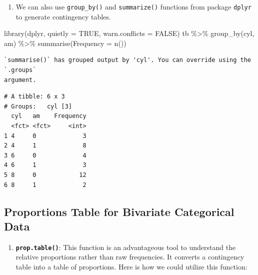 \documentclass[
  letterpaper,
  DIV=11,
  numbers=noendperiod]{scrreport}
\newenvironment{Shaded}{\begin{snugshade}}{\end{snugshade}}
\newcommand{\AttributeTok}[1]{\textcolor[rgb]{0.40,0.45,0.13}{#1}}
\newcommand{\ConstantTok}[1]{\textcolor[rgb]{0.56,0.35,0.01}{#1}}
\newcommand{\DecValTok}[1]{\textcolor[rgb]{0.68,0.00,0.00}{#1}}
\newcommand{\FunctionTok}[1]{\textcolor[rgb]{0.28,0.35,0.67}{#1}}
\newcommand{\NormalTok}[1]{\textcolor[rgb]{0.00,0.23,0.31}{#1}}
\newcommand{\OtherTok}[1]{\textcolor[rgb]{0.00,0.23,0.31}{#1}}
\newcommand{\SpecialCharTok}[1]{\textcolor[rgb]{0.37,0.37,0.37}{#1}}
\providecommand{\tightlist}{%
  \setlength{\itemsep}{0pt}\setlength{\parskip}{0pt}}\usepackage{longtable,booktabs,array}
\begin{document}
\begin{enumerate}
\def\labelenumi{\arabic{enumi}.}
\setcounter{enumi}{4}
\tightlist
\item
  We can also use \texttt{group\_by()} and \texttt{summarize()}
  functions from package \texttt{dplyr} to generate contingency tables.
\end{enumerate}

\begin{Shaded}
\begin{Highlighting}[]
\FunctionTok{library}\NormalTok{(dplyr, }\AttributeTok{quietly =} \ConstantTok{TRUE}\NormalTok{, }\AttributeTok{warn.conflicts =} \ConstantTok{FALSE}\NormalTok{)}
\NormalTok{tb }\SpecialCharTok{\%\textgreater{}\%} 
  \FunctionTok{group\_by}\NormalTok{(cyl, am) }\SpecialCharTok{\%\textgreater{}\%}
  \FunctionTok{summarise}\NormalTok{(}\AttributeTok{Frequency =} \FunctionTok{n}\NormalTok{()) }
\end{Highlighting}
\end{Shaded}

\begin{verbatim}
`summarise()` has grouped output by 'cyl'. You can override using the `.groups`
argument.
\end{verbatim}

\begin{verbatim}
# A tibble: 6 x 3
# Groups:   cyl [3]
  cyl   am    Frequency
  <fct> <fct>     <int>
1 4     0             3
2 4     1             8
3 6     0             4
4 6     1             3
5 8     0            12
6 8     1             2
\end{verbatim}

\hypertarget{proportions-table-for-bivariate-categorical-data}{%
\subsection{Proportions Table for Bivariate Categorical
Data}\label{proportions-table-for-bivariate-categorical-data}}

\begin{enumerate}
\def\labelenumi{\arabic{enumi}.}
\setcounter{enumi}{5}
\tightlist
\item
  \textbf{\texttt{prop.table()}}: This function is an advantageous tool
  to understand the relative proportions rather than raw frequencies. It
  converts a contingency table into a table of proportions. Here is how
  we could utilize this function:
\end{enumerate}

\begin{Shaded}
\end{Shaded}
\end{document}
